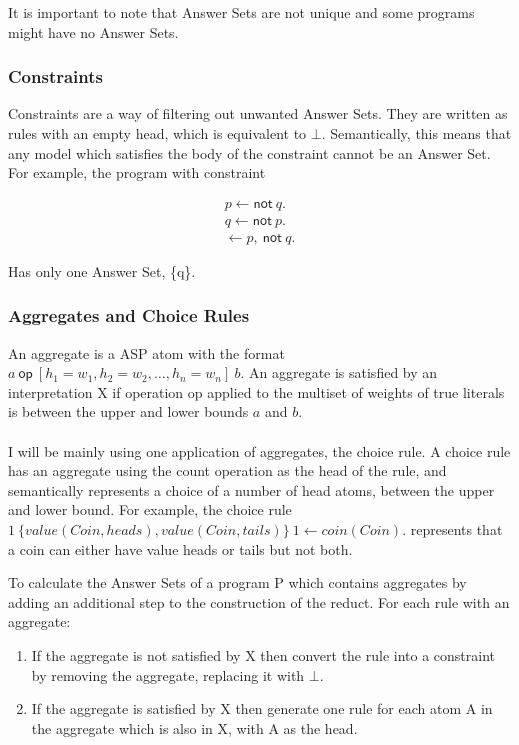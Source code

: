 It is important to note that Answer Sets are not unique and some programs might have no Answer Sets.

\subsubsection{Constraints}

Constraints are a way of filtering out unwanted Answer Sets. They are written as rules with an empty head, which is equivalent to $\bot$. Semantically, this means that any model which satisfies the body of the constraint cannot be an Answer Set. For example, the program with constraint

\begin{align*}
p \gets \textsf{not} \: q. \\
q \gets \textsf{not} \: p. \\
\gets p, \: \textsf{not} \: q.
\end{align*}

Has only one Answer Set, \{q\}.

\subsubsection{Aggregates and Choice Rules}

An aggregate is a ASP atom with the format $a \: \textsf{op} \: [h_1=w_1, h_2=w_2, \dots, h_n=w_n 	] \: b$. An aggregate is satisfied by an interpretation X if operation op applied to the multiset of weights of true literals is between the upper and lower bounds $a$ and $b$. \\ \\

I will be mainly using one application of aggregates, the choice rule. A choice rule has an aggregate using the count operation as the head of the rule, and semantically represents a choice of a number of head atoms, between the upper and lower bound. For example, the choice rule $1 \: \{ value(Coin, heads), value(Coin, tails)\} \: 1 \gets coin(Coin).$ represents that a coin can either have value heads or tails but not both.

To calculate the Answer Sets of a program P which contains aggregates by adding an additional step to the construction of the reduct. For each rule with an aggregate:

\begin{enumerate}
\item If the aggregate is not satisfied by X then convert the rule into a constraint by removing the aggregate, replacing it with $\bot$.
\item If the aggregate is satisfied by X then generate one rule for each atom A in the aggregate which is also in X, with A as the head.
\end{enumerate}

